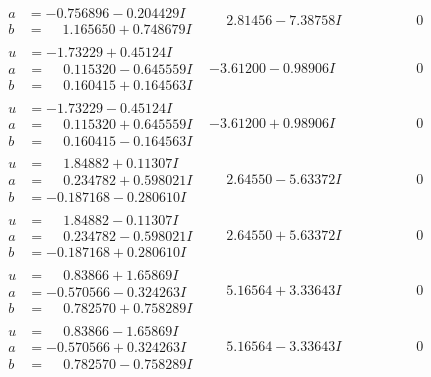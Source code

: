 \documentclass[1p]{elsarticle_modified}
\theoremstyle{definition}
\begin{document}
$$\begin{array}{c|c|c}
\begin{aligned}
a &= -0.756896 - 0.204429 I \\
b &= \phantom{-}1.165650 + 0.748679 I\end{aligned}
 & \phantom{-}2.81456 - 7.38758 I & \phantom{-0.000000 } 0 \\ \hline\begin{aligned}
u &= -1.73229 + 0.45124 I \\
a &= \phantom{-}0.115320 - 0.645559 I \\
b &= \phantom{-}0.160415 + 0.164563 I\end{aligned}
 & -3.61200 - 0.98906 I & \phantom{-0.000000 } 0 \\ \hline\begin{aligned}
u &= -1.73229 - 0.45124 I \\
a &= \phantom{-}0.115320 + 0.645559 I \\
b &= \phantom{-}0.160415 - 0.164563 I\end{aligned}
 & -3.61200 + 0.98906 I & \phantom{-0.000000 } 0 \\ \hline\begin{aligned}
u &= \phantom{-}1.84882 + 0.11307 I \\
a &= \phantom{-}0.234782 + 0.598021 I \\
b &= -0.187168 - 0.280610 I\end{aligned}
 & \phantom{-}2.64550 - 5.63372 I & \phantom{-0.000000 } 0 \\ \hline\begin{aligned}
u &= \phantom{-}1.84882 - 0.11307 I \\
a &= \phantom{-}0.234782 - 0.598021 I \\
b &= -0.187168 + 0.280610 I\end{aligned}
 & \phantom{-}2.64550 + 5.63372 I & \phantom{-0.000000 } 0 \\ \hline\begin{aligned}
u &= \phantom{-}0.83866 + 1.65869 I \\
a &= -0.570566 - 0.324263 I \\
b &= \phantom{-}0.782570 + 0.758289 I\end{aligned}
 & \phantom{-}5.16564 + 3.33643 I & \phantom{-0.000000 } 0 \\ \hline\begin{aligned}
u &= \phantom{-}0.83866 - 1.65869 I \\
a &= -0.570566 + 0.324263 I \\
b &= \phantom{-}0.782570 - 0.758289 I\end{aligned}
 & \phantom{-}5.16564 - 3.33643 I & \phantom{-0.000000 } 0 \\ \hline\begin{aligned}

\end{aligned}
\end{array}$$
\end{document}
